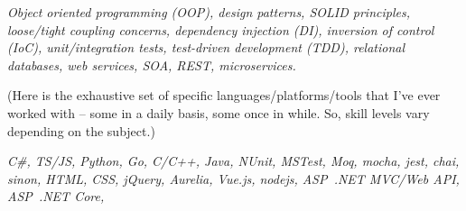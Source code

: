 \documentclass[10pt,a4paper]{article}
\begin{document}
\begin{customitemize}
    \item[] 
    \item[] 
    \item[] 
\end{customitemize}
\sectionrule{}

\begin{customitemize}
    \item[] 
    \begin{customitemize}
        \item {\textit{Object oriented programming (OOP), design patterns, SOLID principles,
                        loose/tight coupling concerns, dependency injection (DI), inversion of
                        control (IoC), unit/integration tests, test-driven development (TDD),
                        relational databases, web services, SOA, REST, microservices.
                    }}
    \end{customitemize}
    \item[] 
    \begin{customitemize}
        \item[] {
                    (Here is the exhaustive set of specific languages/platforms/tools
                    that I've ever worked with -- some in a daily basis, some once in while.
                    So, skill levels vary depending on the subject.)
              }
        \item {
                    \textit{
                        C\#,
                        TS/JS,
                        Python,
                        Go,
                        C/C++,
                        Java,
                        NUnit,
                        MSTest,
                        Moq,
                        mocha,
                        jest,
                        chai,
                        sinon,
                        HTML,
                        CSS,
                        jQuery,
                        Aurelia,
                        Vue.js,
                        nodejs,
                        ASP~.NET MVC/Web API,
                        ASP~.NET Core,
}}
\end{customitemize}
\end{customitemize}
\end{document}
